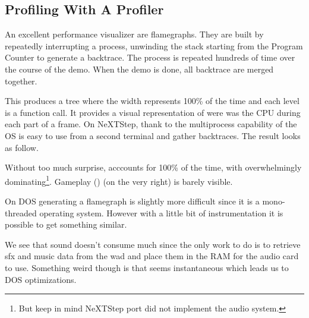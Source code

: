 \subsection{Profiling With A Profiler}
An excellent performance visualizer are flamegraphs. They are built by repeatedly interrupting a process, unwinding the stack starting from the Program Counter to generate a backtrace. The process is repeated hundreds of time over the course of the demo. When the demo is done, all backtrace are merged together.\\
\par
 This produces a tree where the width represents 100\% of the time and each level is a function call. It provides a  visual representation of were was the CPU during each part of a frame. On NeXTStep, thank to the multiprocess capability of the OS is easy to use  from a second terminal and gather backtraces. The result looks as follow.\\
\par

\par
Without too much surprise,  acccounts for 100\% of the time, with  overwhelmingly dominating\footnote{But keep in mind NeXTStep port did not implement the audio system.}. Gameplay () (on the very right) is barely visible.\\
\par
On DOS generating a flamegraph is slightly more difficult since it is a mono-threaded operating system. However with a little bit of instrumentation it is possible to get something similar.\\
\par
{}
\par
We see that sound doesn't consume much since the only work to do is to retrieve sfx and music data from the wad and place them in the RAM for the audio card to use. Something weird though is that  seems instantaneous which leads us to DOS optimizations.\\
\par


